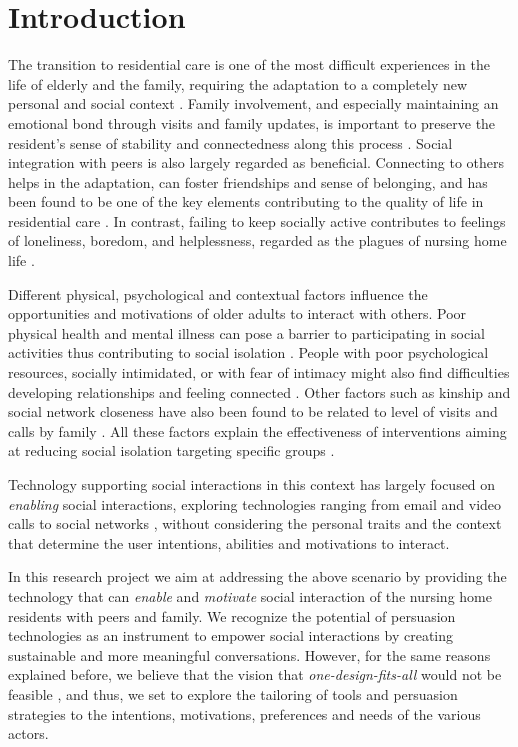 \documentclass[runningheads,a4paper,oribibl]{llncs}
\begin{document}
\section{Introduction}

The transition to residential care is one of the most difficult experiences in the life of elderly and the family, requiring the adaptation to a completely new personal and social context \cite{lee2002review}.  Family involvement, and especially maintaining an emotional bond through visits and family updates, is important to preserve the resident’s sense of stability and connectedness along this process \cite{friedemann1997family}.  Social integration with peers is also largely regarded as beneficial. Connecting to others helps in the adaptation, can foster friendships and sense of belonging, and has been found to be one of the key elements contributing to the quality of life in residential care \cite{bradshaw2012living}. In contrast, failing to keep socially active contributes to feelings of loneliness, boredom, and helplessness, regarded as the plagues of nursing home life \cite{thomas1996life,lindley2015placing}.

Different physical, psychological and contextual factors influence the opportunities and motivations of older adults to interact with others. Poor physical health and mental illness can pose a barrier to participating in social activities thus contributing to social isolation \cite{edelbrock2001social}. People with poor psychological resources, socially intimidated, or with fear of intimacy might also find difficulties developing relationships and feeling connected \cite{windle2004variations,rokach1996causes}. Other factors such as kinship and social network closeness have also been found to be related to level of visits and calls by family \cite{port2001resident}. All these factors explain the effectiveness of interventions aiming at reducing social isolation targeting specific groups \cite{cattan2005preventing}.

Technology supporting social interactions in this context has largely focused on \emph{enabling} social interactions, exploring technologies ranging from email and video calls to social networks \cite{findlay2003interventions}, without considering the personal traits and the context that determine the user intentions, abilities and motivations to interact. 

In this research project we aim at addressing the above scenario by providing the technology that can \emph{enable} and \emph{motivate} social interaction of the nursing home residents with peers and family. We recognize the potential of persuasion technologies \cite{oinas2009persuasive} as an instrument to empower social interactions by creating sustainable and more meaningful conversations. However, for the same reasons explained before, we believe that the vision that \emph{one-design-fits-all} would not be feasible \cite{orji2014design}, and thus, we set to explore the tailoring of tools and persuasion strategies to the intentions, motivations, preferences and needs of the various actors.
\end{document}
